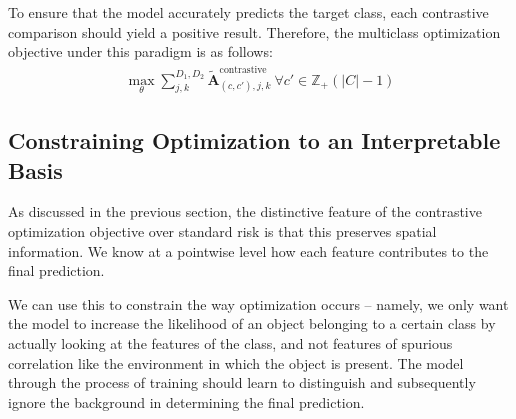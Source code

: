 \documentclass{article}
\begin{document}
To ensure that the model accurately predicts the target class, each contrastive comparison should yield a positive result. Therefore, the multiclass optimization objective under this paradigm is as follows:
\begin{gather}
	\max_{\theta} \sum^{D_1,D_2}_{j,k}\tilde{\mathcal{\bm{A}}}_{(c, c'),j,k}^{\text{contrastive}}\ \forall c' \in \mathbb{Z}_{+}(|C| - 1)
\end{gather}

\subsection{Constraining Optimization to an Interpretable Basis}

As discussed in the previous section, the distinctive feature of the contrastive optimization objective over standard risk is that this preserves spatial information. We know at a pointwise level how each feature contributes to the final prediction.

We can use this to constrain the way optimization occurs -- namely, we only want the model to increase the likelihood of an object belonging to a certain class by actually looking at the features of the class, and not features of spurious correlation like the environment in which the object is present. The model through the process of training should learn to distinguish and subsequently ignore the background in determining the final prediction.
\end{document}
